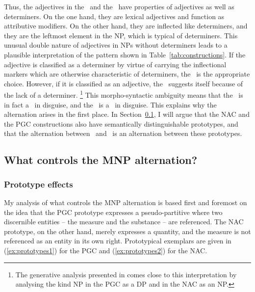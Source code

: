 Thus, the adjectives in the \NACa\ and the \PGCa\ have properties of adjectives as well as determiners.
On the one hand, they are lexical adjectives and function as attributive modifiers.
On the other hand, they are inflected like determiners, and they are the leftmost element in the NP, which is typical of determiners.
This unusual double nature of adjectives in NPs without determiners leads to a plausible interpretation of the pattern shown in Table~\ref{tab:constructions}.
If the adjective is classified as a determiner by virtue of carrying the inflectional markers which are otherwise characteristic of determiners, the \PGCa\ is the appropriate choice.
However, if it is classified as an adjective, the \NACa\ suggests itself because of the lack of a determiner.%
\footnote{The generative analysis presented in \cite{Bhatt1990} comes close to this interpretation by analysing the kind NP in the PGC as a DP and in the NAC as an NP.}
This morpho-syntactic ambiguity means that the \NACa\ is in fact a \NACb\ in disguise, and the \PGCa\ is a \PGCd\ in disguise.
This explains why the alternation arises in the first place.
In Section~\ref{sec:analyses}, I will argue that the NAC and the PGC constructions also have semantically distinguishable prototypes, and that the alternation between \PGCa\ and \NACa\ is an alternation between these prototypes.


\subsection{What controls the MNP alternation?}
\label{sec:analyses}

\subsubsection{Prototype effects}
\label{sec:prototypeeffects}

My analysis of what controls the MNP alternation is based first and foremost on the idea that the PGC prototype expresses a pseudo-partitive where two discernible entities -- the measure and the substance -- are referenced.
The NAC prototype, on the other hand, merely expresses a quantity, and the measure is not referenced as an entity in its own right.
Prototypical exemplars are given in (\ref{ex:prototypes1}) for the PGC and (\ref{ex:prototypes2}) for the NAC.

\begin{exe}
  \ex\label{ex:prototypes} 
  \begin{xlist}
  \end{xlist}
\end{exe}

